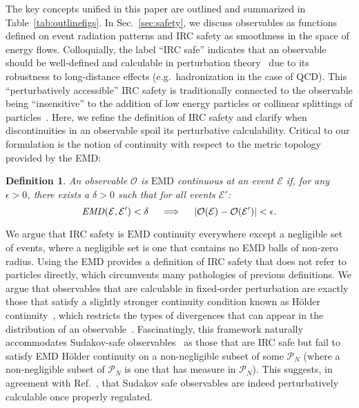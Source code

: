 \documentclass[letterpaper,11pt]{article}
\newcommand{\E}{\mathcal{E}}
\renewcommand{\O}{\mathcal{O}}
\DeclareRobustCommand{\Sec}[1]{Sec.~\ref{#1}}
\DeclareRobustCommand{\Tab}[1]{Table~\ref{#1}}
\DeclareRobustCommand{\Ref}[1]{Ref.~\cite{#1}}
\newtheorem{definition}{Definition}
\newcommand{\EMD}{\text{EMD}\xspace}
\begin{document}
The key concepts unified in this paper are outlined and summarized in \Tab{tab:outlinefigs}.
%
In \Sec{sec:safety}, we discuss observables as functions defined on event radiation patterns and IRC safety as smoothness in the space of energy flows.
%
Colloquially, the label ``IRC safe'' indicates that an observable should be well-defined and calculable in perturbation theory~\cite{Kinoshita:1962ur,Lee:1964is} due to its robustness to long-distance effects (e.g.~hadronization in the case of QCD).
%
This ``perturbatively accessible'' IRC safety is traditionally connected to the observable being ``insensitive'' to the addition of low energy particles or collinear splittings of particles~\cite{Sterman:1977wj,Sterman:1978bi,Sterman:1978bj,Sterman:1979uw,sterman1995handbook,Weinberg:1995mt,Ellis:1991qj,Banfi:2004yd}.
%
Here, we refine the definition of IRC safety and clarify when discontinuities in an observable spoil its perturbative calculability.
%
Critical to our formulation is the notion of continuity with respect to the metric topology provided by the EMD:
%
\begin{definition}\label{def:emdcontinuity}
An observable $\O$ is $\EMD$ continuous at an event $\E$ if, for any $\epsilon>0$, there exists a $\delta>0$ such that for all events $\E'$:
\begin{equation}\label{eq:emdcontinuity}
\text{\emph{EMD}}(\E,\E')<\delta \quad \implies\quad |\O(\E) - \O(\E')| < \epsilon.
\end{equation}
\end{definition}
%
\noindent We argue that IRC safety is $\EMD$ continuity everywhere except a negligible set of events, where a negligible set is one that contains no EMD balls of non-zero radius.
%
Using the EMD provides a definition of IRC safety that does not refer to particles directly, which circumvents many pathologies of previous definitions.
%
We argue that observables that are calculable in fixed-order perturbation are exactly those that satisfy a slightly stronger continuity condition known as H\"older continuity~\cite{Ortega2000,Gilbarg2001}, which restricts the types of divergences that can appear in the distribution of an observable~\cite{Sterman:1979uw,Banfi:2004yd}.
%
Fascinatingly, this framework naturally accommodates Sudakov-safe observables~\cite{Larkoski:2013paa,Larkoski:2014wba,Larkoski:2015lea} as those that are IRC safe but fail to satisfy EMD H\"older continuity on a non-negligible subset of some $\mathcal P_N$ (where a non-negligible subset of $\mathcal P_N$ is one that has measure in $\mathcal P_N$).
%
This suggests, in agreement with \Ref{Larkoski:2015lea}, that Sudakov safe observables are indeed perturbatively calculable once properly regulated.
\end{document}

